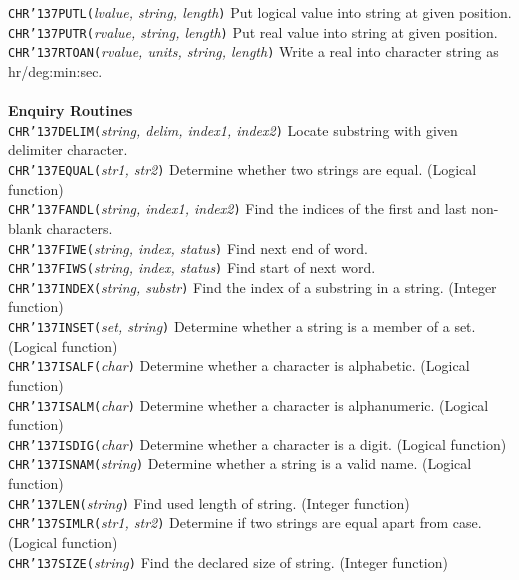 \documentclass[twoside,11pt]{article}
\renewcommand{\_}{{\tt\char'137}}
\begin{document}
\begin{tabbing}
 {{\tt{CHR\_PUTL(}}{\em lvalue, string, length}{\tt )}}\>
 Put logical value into string at given position.\\
 {{\tt{CHR\_PUTR(}}{\em rvalue, string, length}{\tt )}}\>
 Put real value into string at given position.\\
 {{\tt{CHR\_RTOAN(}}{\em rvalue, units, string, length}{\tt )}}\>
 Write a real into character string as hr/deg:min:sec.\\
\\
{\bf Enquiry Routines}\\
 {{\tt{CHR\_DELIM(}}{\em string, delim, index1, index2}{\tt )}} \>
 Locate substring with given delimiter character.\\
 {{\tt{CHR\_EQUAL(}}{\em str1, str2}{\tt )}}\>
 Determine whether two strings are equal. (Logical function)\\
 {{\tt{CHR\_FANDL(}}{\em string, index1, index2}{\tt )}}\>
 Find the indices of the first and last non-blank characters.\\
 {{\tt{CHR\_FIWE(}}{\em string, index, status}{\tt )}}\>
 Find next end of word.\\
 {{\tt{CHR\_FIWS(}}{\em string, index, status}{\tt )}}\>
 Find start of next word.\\
 {{\tt{CHR\_INDEX(}}{\em string, substr}{\tt )}}\>
 Find the index of a substring in a string. (Integer function)\\
 {{\tt{CHR\_INSET(}}{\em set, string}{\tt )}}\>
 Determine whether a string is a member of a set. (Logical function)\\
 {{\tt{CHR\_ISALF(}}{\em char}{\tt )}}\>
 Determine whether a character is alphabetic. (Logical function)\\
 {{\tt{CHR\_ISALM(}}{\em char}{\tt )}}\>
 Determine whether a character is alphanumeric. (Logical function)\\
 {{\tt{CHR\_ISDIG(}}{\em char}{\tt )}}\>
 Determine whether a character is a digit. (Logical function)\\
 {{\tt{CHR\_ISNAM(}}{\em string}{\tt )}}\>
 Determine whether a string is a valid name. (Logical function)\\
 {{\tt{CHR\_LEN(}}{\em string}{\tt )}}\>
 Find used length of string. (Integer function)\\
 {{\tt{CHR\_SIMLR(}}{\em str1, str2}{\tt )}}\>
 Determine if two strings are equal apart from case. (Logical function)\\
 {{\tt{CHR\_SIZE(}}{\em string}{\tt )}}\>
 Find the declared size of string. (Integer function)\\

\end{tabbing}
\end{document}
